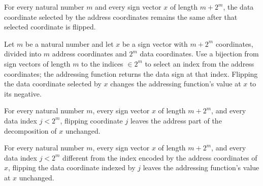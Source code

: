 \begin{theorem}
\label{FABL.addressingSelectedCoordinate_flip}
\leanok
{}
For every natural number $m$ and every sign vector $x$ of length $m+2^m$, the data
coordinate selected by the address coordinates remains the same after that selected
coordinate is flipped.
\end{theorem}

\begin{theorem}
\label{FABL.addressingFunction_flip_selected}
\leanok
{}
Let $m$ be a natural number and let $x$ be a sign vector with $m+2^m$ coordinates,
divided into $m$ address coordinates and $2^m$ data coordinates. Use a bijection from
sign vectors of length $m$ to the indices $\in{2^m}$ to select an index from the address
coordinates; the addressing function returns the data sign at that index. Flipping the
data coordinate selected by $x$ changes the addressing function's value at $x$ to its
negative.
\end{theorem}

\begin{theorem}
\label{FABL.addressingInputEquiv_first_flip_data}
\leanok
{}
For every natural number $m$, every sign vector $x$ of length $m+2^m$, and every data
index $j<2^m$, flipping coordinate $j$ leaves the address part of the decomposition of
$x$ unchanged.
\end{theorem}

\begin{theorem}
\label{FABL.addressingFunction_flip_data_of_ne}
\leanok
{}
For every natural number $m$, every sign vector $x$ of length $m+2^m$, and every data
index $j<2^m$ different from the index encoded by the address coordinates of $x$,
flipping the data coordinate indexed by $j$ leaves the addressing function's value at
$x$ unchanged.
\end{theorem}

